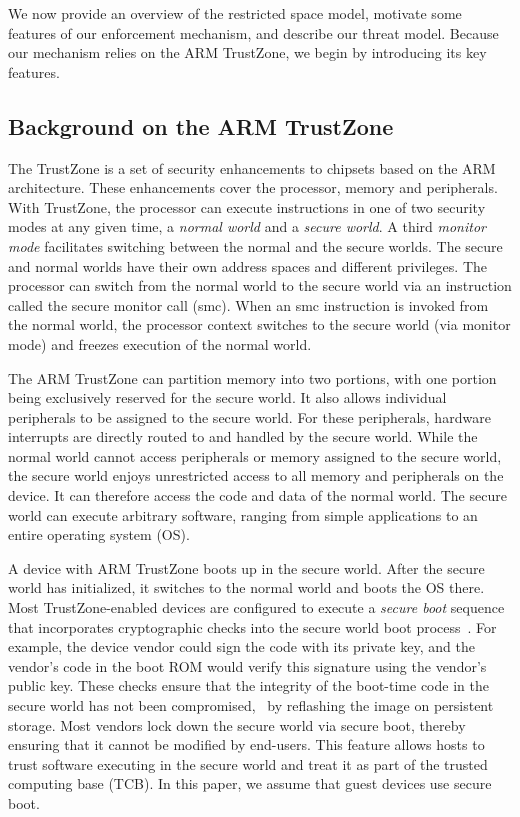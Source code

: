 \label{section:usagemodel}

We now provide an overview of the restricted space model, motivate some
features of our enforcement mechanism, and describe our threat model. Because
our mechanism relies on the ARM TrustZone, we begin by introducing its key
features.

\subsection{Background on the ARM TrustZone}
\label{section:armback}

The TrustZone is a set of security enhancements to chipsets based on the ARM
architecture. These enhancements cover the processor, memory and peripherals.
With TrustZone, the processor can execute instructions in one of two security
modes at any given time, a \textit{normal world} and a \textit{secure world}. A
third \textit{monitor mode} facilitates switching between the normal and the
secure worlds.  The secure and normal worlds have their own address spaces and
different privileges.  The processor can switch from the normal world to the
secure world via an instruction called the secure monitor call (\textsf{smc}).
When an \textsf{smc} instruction is invoked from the normal world, the
processor context switches to the secure world (via monitor mode) and freezes
execution of the normal world.

The ARM TrustZone can partition memory into two portions, with one portion
being exclusively reserved for the secure world. It also allows individual
peripherals to be assigned to the secure world.  For these peripherals,
hardware interrupts are directly routed to and handled by the secure world.
While the normal world cannot access peripherals or memory assigned to the
secure world, the secure world enjoys unrestricted access to all memory and
peripherals on the device. It can therefore access the code and data of the
normal world. The secure world can execute arbitrary software, ranging from
simple applications to an entire operating system (OS).
%

A device with ARM TrustZone boots up in the secure world. After the secure
world has initialized, it switches to the normal world and boots the OS there.
Most TrustZone-enabled devices are configured to execute a \textit{secure boot}
sequence that incorporates cryptographic checks into the secure world boot
process~\cite[\S5.2.2]{armtz}. For example, the device vendor could sign the
code with its private key, and the vendor's code in the boot ROM would verify
this signature using the vendor's public key. These checks ensure that the
integrity of the boot-time code in the secure world has not been compromised,
\eg~by reflashing the image on persistent storage. Most vendors lock down the
secure world via secure boot, thereby ensuring that it cannot be modified by
end-users. This feature allows hosts to trust software executing in the secure
world and treat it as part of the trusted computing base (TCB). In this paper,
we assume that guest devices use secure boot.

